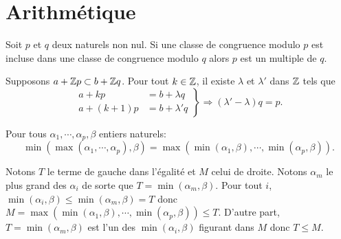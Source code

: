 \section{Arithmétique}
\begin{propn}
Soit $p$ et $q$ deux naturels non nul. Si une classe de congruence modulo $p$ est incluse dans une classe de congruence modulo $q$ alors $p$ est un multiple de $q$.
\end{propn}
\begin{demo}
 Supposons $a+\mathbb{Z} p \subset b + \mathbb{Z} q$. Pour tout $k \in \mathbb{Z}$, il existe $\lambda$ et $\lambda'$ dans $\mathbb{Z}$ tels que
\begin{displaymath}
 \left.
   \begin{aligned}
    a + kp &= b + \lambda q \\
    a + (k+1)p &= b + \lambda' q
   \end{aligned}
  \right\rbrace
  \Rightarrow (\lambda' - \lambda) q = p.
\end{displaymath}
\end{demo}

\begin{lem}
  Pour tous $\alpha_1, \cdots, \alpha_p, \beta$ entiers naturels:
  \begin{displaymath}
    \min \left( \max(\alpha_1, \cdots, \alpha_p) , \beta \right) = \max\left( \min(\alpha_1, \beta), \cdots , \min(\alpha_p,\beta)\right).
  \end{displaymath}
\end{lem}
\begin{demo}
  Notons $T$ le terme de gauche dans l'égalité et $M$ celui de droite. Notons $\alpha_m$ le plus grand des $\alpha_i$ de sorte que $T = \min(\alpha_m, \beta)$.\newline
  Pour tout $i$, $\min(\alpha_i, \beta) \leq \min (\alpha_m, \beta) = T$ donc $M = \max\left( \min(\alpha_1, \beta), \cdots , \min(\alpha_p,\beta)\right) \leq T$.\newline
  D'autre part, $T=\min (\alpha_m, \beta)$ est l'un des $\min(\alpha_i, \beta)$ figurant dans $M$ donc $T \leq M$.
\end{demo}

